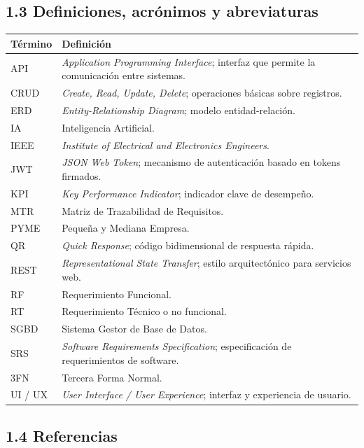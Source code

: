 \documentclass[12pt, letterpaper]{report}
\begin{document}
\subsection*{1.3 Definiciones, acrónimos y abreviaturas}

\noindent
\begin{tabular}{|p{3cm}|p{10.5cm}|}
\hline
\textbf{Término} & \textbf{Definición} \\
\hline
API & \textit{Application Programming Interface}; interfaz que permite la comunicación entre sistemas. \\
\hline
CRUD & \textit{Create, Read, Update, Delete}; operaciones básicas sobre registros. \\
\hline
ERD & \textit{Entity-Relationship Diagram}; modelo entidad-relación. \\
\hline
IA & Inteligencia Artificial. \\
\hline
IEEE & \textit{Institute of Electrical and Electronics Engineers}. \\
\hline
JWT & \textit{JSON Web Token}; mecanismo de autenticación basado en tokens firmados. \\
\hline
KPI & \textit{Key Performance Indicator}; indicador clave de desempeño. \\
\hline
MTR & Matriz de Trazabilidad de Requisitos. \\
\hline
PYME & Pequeña y Mediana Empresa. \\
\hline
QR & \textit{Quick Response}; código bidimensional de respuesta rápida. \\
\hline
REST & \textit{Representational State Transfer}; estilo arquitectónico para servicios web. \\
\hline
RF & Requerimiento Funcional. \\
\hline
RT & Requerimiento Técnico o no funcional. \\
\hline
SGBD & Sistema Gestor de Base de Datos. \\
\hline
SRS & \textit{Software Requirements Specification}; especificación de requerimientos de software. \\
\hline
3FN & Tercera Forma Normal. \\
\hline
UI / UX & \textit{User Interface / User Experience}; interfaz y experiencia de usuario. \\
\hline
\end{tabular}

\subsection*{1.4 Referencias}
\end{document}

